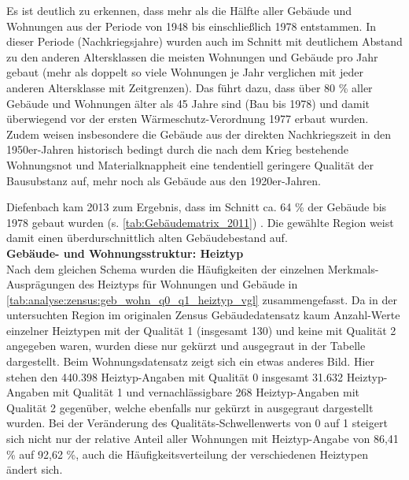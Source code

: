 			Es ist deutlich zu erkennen, dass mehr als die Hälfte aller Gebäude und Wohnungen aus der Periode von 1948 bis einschließlich 1978 entstammen. In dieser Periode (Nachkriegsjahre) wurden auch im Schnitt mit deutlichem Abstand zu den anderen Altersklassen die meisten Wohnungen und Gebäude pro Jahr gebaut (mehr als doppelt so viele Wohnungen je Jahr verglichen mit jeder anderen Altersklasse mit Zeitgrenzen). Das führt dazu, dass über 80 \% aller Gebäude und Wohnungen älter als 45 Jahre sind (Bau bis 1978) und damit überwiegend vor der ersten Wärmeschutz-Verordnung 1977 erbaut wurden. Zudem weisen insbesondere die Gebäude aus der direkten Nachkriegszeit in den 1950er-Jahren historisch bedingt durch die nach dem Krieg bestehende Wohnungsnot und Materialknappheit eine tendentiell geringere Qualität der Bausubstanz auf, mehr noch als Gebäude aus den 1920er-Jahren. \cite{web_baunetzwissen_altbau_50er}
			
			Diefenbach kam 2013 zum Ergebnis, dass im Schnitt ca. 64 \% der Gebäude bis 1978 gebaut wurden (s. \autoref{tab:Gebäudematrix_2011}) \cite{IWU_2015_Wohngebäudetypologie}. Die gewählte Region weist damit einen überdurschnittlich alten Gebäudebestand auf.\\
			
			
		
			\textbf{Gebäude- und Wohnungsstruktur: Heiztyp}\\
			Nach dem gleichen Schema wurden die Häufigkeiten der einzelnen Merkmals-Ausprägungen des Heiztyps für Wohnungen und Gebäude in \autoref{tab:analyse:zensus:geb_wohn_q0_q1_heiztyp_vgl} zusammengefasst. Da in der untersuchten Region im originalen Zensus Gebäudedatensatz kaum Anzahl-Werte einzelner Heiztypen mit der Qualität 1 (insgesamt 130) und keine mit Qualität 2 angegeben waren, wurden diese nur gekürzt und ausgegraut in der Tabelle dargestellt. Beim Wohnungsdatensatz zeigt sich ein etwas anderes Bild. Hier stehen den 440.398 Heiztyp-Angaben mit Qualität 0 insgesamt 31.632 Heiztyp-Angaben mit Qualität 1 und vernachlässigbare 268 Heiztyp-Angaben mit Qualität 2 gegenüber, welche ebenfalls nur gekürzt in ausgegraut dargestellt wurden. Bei der Veränderung des Qualitäts-Schwellenwerts von 0 auf 1 steigert sich nicht nur der relative Anteil aller Wohnungen mit Heiztyp-Angabe von 86,41 \% auf 92,62 \%, auch die Häufigkeitsverteilung der verschiedenen Heiztypen ändert sich. 
					
